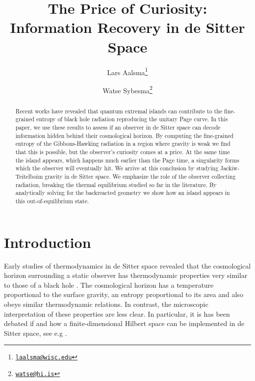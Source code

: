 \documentclass[a4paper,11pt]{article}
\title{\bf The Price of Curiosity: \\Information Recovery in de Sitter Space
}
\author[a]{Lars Aalsma\thanks{\href{mailto:laalsma@wisc.edu}{\texttt{laalsma@wisc.edu}}}}
\author[b]{Watse Sybesma\thanks{\href{mailto:watse@hi.is}{\texttt{watse@hi.is}}}}
\affil[a]{\protect\begin{varwidth}[t]{\linewidth}\protect\centering Department of Physics, University of Wisconsin-Madison, \par 1150 University Ave, Madison, WI 53706, USA\protect\end{varwidth}}
\affil[b]{\protect\begin{varwidth}[t]{\linewidth}\protect\centering 
Science Institute, University of Iceland, \par Dunhaga 3, 107 Reykjav\'{i}k, Iceland
\protect\end{varwidth}}
\date{}
\numberwithin{equation}{section}
\begin{document}
\maketitle
\vspace{2em}
\begin{abstract}
    \noindent
Recent works have revealed that quantum extremal islands can contribute to the fine-grained entropy of black hole radiation reproducing the unitary Page curve. In this paper, we use these results to assess if an observer in de Sitter space can decode information hidden behind their cosmological horizon. By computing the fine-grained entropy of the Gibbons-Hawking radiation in a region where gravity is weak we find that this is possible, but the observer's curiosity comes at a price. At the same time the island appears, which happens much earlier than the Page time, a singularity forms which the observer will eventually hit. We arrive at this conclusion by studying Jackiw-Teitelboim gravity in de Sitter space. We emphasize the role of the observer collecting radiation, breaking the thermal equilibrium studied so far in the literature. By analytically solving for the backreacted geometry we show how an island appears in this out-of-equilibrium state.
\end{abstract}
\vfill

\newpage
\tableofcontents

\section{Introduction}
%
Early studies of thermodynamics in de Sitter space revealed that the cosmological horizon surrounding a static observer has thermodynamic properties very similar to those of a black hole \cite{Gibbons:1977mu}. The cosmological horizon has a temperature proportional to the surface gravity, an entropy proportional to its area and also obeys similar thermodynamic relations. In contrast, the microscopic interpretation of these properties are less clear. In particular, it is has been debated if and how a finite-dimensional Hilbert space can be implemented in de Sitter space, see e.g \cite{Witten:2001kn,Goheer:2002vf,Parikh:2004wh,Parikh:2004ux,Parikh:2002py,Anninos:2011af,Anninos:2017eib,Dong:2018cuv}.
\end{document}

